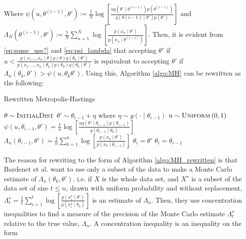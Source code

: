 \documentclass{article}
\theoremstyle{definition}
\begin{document}
Where $\psi\left(u, \theta^{(i-1)}, \theta'\right)\coloneqq \frac{1}{N}\log\left[\frac{u q\left(\theta'\mid\theta^{(i-1)}\right)p\left(\theta^{(i-1)}\right)}{q\left(\theta{(i-1)}\mid \theta'\right)p\left(\theta'\right)}\right]$ and $\Lambda_N\left(\theta^{(i-1)}, \theta'\right) \coloneqq \frac{1}{N}\sum_{n = 1}^N \log\left[\frac{p\left(x_n\mid \theta'\right)}{p\left(x_n\mid\theta^{(i-1)}\right)}\right]$. Then, it is evident from \eqref{eq:some_use?} and \eqref{eq:psi_lambda} that accepting $\theta'$ if $u < \frac{p\left(x_1\ldots, x_n\mid \theta\right)p\left(\theta\right)q\left(\theta_k\mid \theta'\right)}{p\left(x_1, \ldots, x_n\mid \theta_k\right)p\left(\theta_k\right)q\left(\theta_k\mid\theta'\right)}$ is equivalent to accepting $\theta'$ if $\Lambda_n\left(\theta_k, \theta'\right)>\psi\left(u,\theta_k\theta'\right)$. Using this, Algorithm \ref{algo:MH} can be rewritten as the following:
\begin{algorithm}[H] 
    \caption{Rewritten Metropolis-Hastings}
    \label{algo:MH_rewritten}
    \begin{algorithmic}[1] %
        \State $\theta \sim \textsc{InitialDist}$ 
        \State$\theta' \sim \theta_{i-1} + \eta$ where $\eta\sim g\left(\cdot \mid \theta_{i-1}\right)$
        \State $u\sim \textsc{Uniform}\left(0,1\right)$
        \State $\psi\left(u, \theta_{i-1}, \theta'\right) = \frac{1}{n} \log\left[\frac{u q\left(\theta'\mid \theta_{i-1} \right) p \left(\theta_{i-1}\right)}{q\left(\theta_{i-1} \mid \theta_k \right)} \right]$
        \State $\Lambda_n \left(\theta_{i-1}, \theta'\right) = \frac{1}{n} \sum_{k = 1}^n \log \left[\frac{p\left(x_{k}\mid \theta'\right)}{p\left(x_{k}\mid \theta_{i-1}\right)}\right]$
        \State $\theta_i = \theta'$
        \Else 
        \State $\theta_i = \theta_{i-1}$
         \EndIf
         \EndFor
    \end{algorithmic}
\end{algorithm}
The reason for rewriting to the form of Algorithm \ref{algo:MH_rewritten} is that Bardenet et al. want to use only a subset of the data to make a Monte Carlo estimate of $\Lambda_n\left(\theta_k, \theta'\right)$.  i.e. if $X$ is the whole data set, and $X^{\star}$ is a subset of the data set of size $t\leq n$, drawn with uniform probability and without replacement, $\Lambda^{\star}_t = \frac{1}{t} \sum_{i = 1}^t \log\left[\frac{p\left(x_i^{\star}\mid \theta'\right)}{p\left(x_i^{\star}\mid \theta_k\right)}\right]$ is an estimate of $\Lambda_n$.  Then, they use concentration inequalities to find a measure of the precision of the Monte Carlo estimate $\Lambda_t^{\star}$ relative to the true value,  $\Lambda_n$. A concentration inequality is an inequality on the form 
\end{document}
